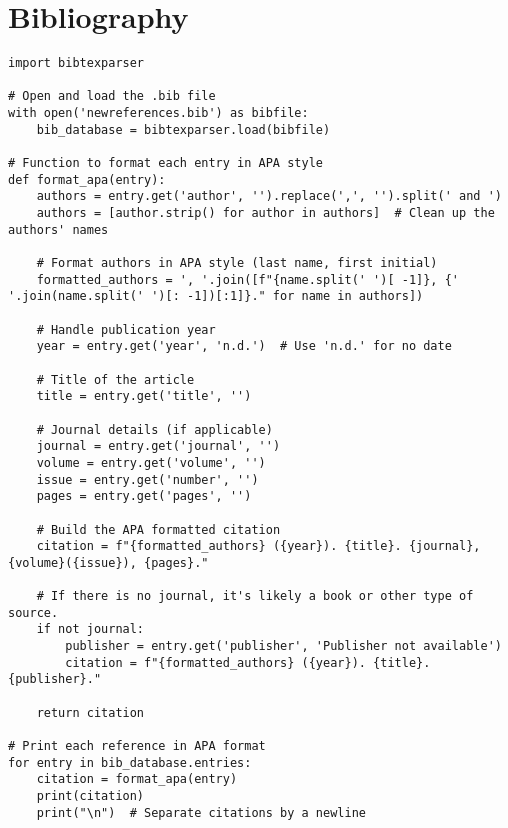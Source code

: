 \chapter{Bibliography}

\begin{verbatim}
import bibtexparser

# Open and load the .bib file
with open('newreferences.bib') as bibfile:
    bib_database = bibtexparser.load(bibfile)

# Function to format each entry in APA style
def format_apa(entry):
    authors = entry.get('author', '').replace(',', '').split(' and ')
    authors = [author.strip() for author in authors]  # Clean up the authors' names

    # Format authors in APA style (last name, first initial)
    formatted_authors = ', '.join([f"{name.split(' ')[ -1]}, {' '.join(name.split(' ')[: -1])[:1]}." for name in authors])
    
    # Handle publication year
    year = entry.get('year', 'n.d.')  # Use 'n.d.' for no date
    
    # Title of the article
    title = entry.get('title', '')
    
    # Journal details (if applicable)
    journal = entry.get('journal', '')
    volume = entry.get('volume', '')
    issue = entry.get('number', '')
    pages = entry.get('pages', '')
    
    # Build the APA formatted citation
    citation = f"{formatted_authors} ({year}). {title}. {journal}, {volume}({issue}), {pages}."
    
    # If there is no journal, it's likely a book or other type of source.
    if not journal:
        publisher = entry.get('publisher', 'Publisher not available')
        citation = f"{formatted_authors} ({year}). {title}. {publisher}."
    
    return citation

# Print each reference in APA format
for entry in bib_database.entries:
    citation = format_apa(entry)
    print(citation)
    print("\n")  # Separate citations by a newline
\end{verbatim}

